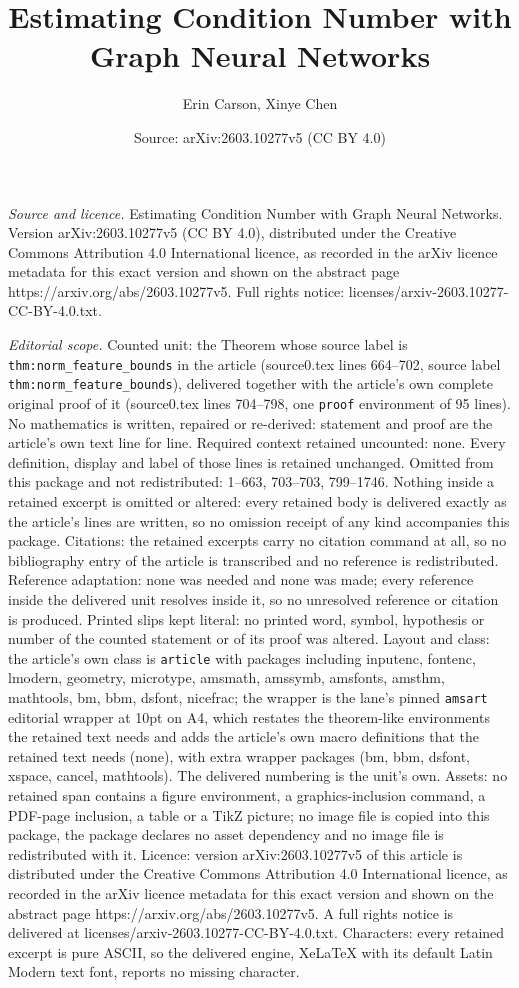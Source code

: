 \documentclass[10pt,a4paper]{amsart}
\title[Estimating Condition Number with Graph Neural Networks]{Estimating Condition Number with Graph Neural Networks}
\author{Erin Carson, Xinye Chen}
\date{Source: arXiv:2603.10277v5 (CC BY 4.0)}
\begin{document}
\maketitle

\noindent\emph{Source and licence.} Estimating Condition Number with Graph Neural Networks. Version arXiv:2603.10277v5 (CC BY 4.0), distributed under the Creative Commons Attribution 4.0 International licence, as recorded in the arXiv licence metadata for this exact version and shown on the abstract page https://arxiv.org/abs/2603.10277v5. Full rights notice: licenses/arxiv-2603.10277-CC-BY-4.0.txt.\par\smallskip

\noindent\textit{Editorial scope.} Counted unit: the Theorem whose source label is \texttt{thm:norm\_feature\_bounds} in the article (source0.tex lines 664--702, source label \texttt{thm:norm\_feature\_bounds}), delivered together with the article's own complete original proof of it (source0.tex lines 704--798, one \texttt{proof} environment of 95 lines). No mathematics is written, repaired or re-derived: statement and proof are the article's own text line for line. Required context retained uncounted: none. Every definition, display and label of those lines is retained unchanged. Omitted from this package and not redistributed: 1--663, 703--703, 799--1746. Nothing inside a retained excerpt is omitted or altered: every retained body is delivered exactly as the article's lines are written, so no omission receipt of any kind accompanies this package. Citations: the retained excerpts carry no citation command at all, so no bibliography entry of the article is transcribed and no reference is redistributed. Reference adaptation: none was needed and none was made; every reference inside the delivered unit resolves inside it, so no unresolved reference or citation is produced. Printed slips kept literal: no printed word, symbol, hypothesis or number of the counted statement or of its proof was altered. Layout and class: the article's own class is \texttt{article} with packages including inputenc, fontenc, lmodern, geometry, microtype, amsmath, amssymb, amsfonts, amsthm, mathtools, bm, bbm, dsfont, nicefrac; the wrapper is the lane's pinned \texttt{amsart} editorial wrapper at 10pt on A4, which restates the theorem-like environments the retained text needs and adds the article's own macro definitions that the retained text needs (none), with extra wrapper packages (bm, bbm, dsfont, xspace, cancel, mathtools). The delivered numbering is the unit's own. Assets: no retained span contains a figure environment, a graphics-inclusion command, a PDF-page inclusion, a table or a TikZ picture; no image file is copied into this package, the package declares no asset dependency and no image file is redistributed with it. Licence: version arXiv:2603.10277v5 of this article is distributed under the Creative Commons Attribution 4.0 International licence, as recorded in the arXiv licence metadata for this exact version and shown on the abstract page https://arxiv.org/abs/2603.10277v5. A full rights notice is delivered at licenses/arxiv-2603.10277-CC-BY-4.0.txt. Characters: every retained excerpt is pure ASCII, so the delivered engine, XeLaTeX with its default Latin Modern text font, reports no missing character.
\end{document}

